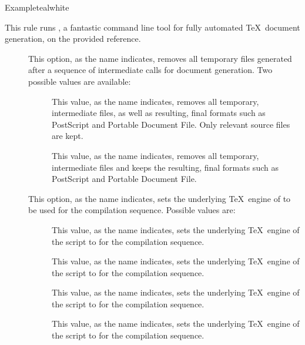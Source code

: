 \begin{description}
\begin{codebox}{Example}{teal}{\icnote}{white}
\end{codebox}

\item[\rulebox{latexmk}{Marco Daniel, Brent Longborough, Paulo Cereda}] This rule runs , a fantastic command line tool for fully automated \TeX\ document generation, on the provided  reference.

\begin{description}
\item[] This option, as the name indicates, removes all temporary files generated after a sequence of intermediate calls for document generation. Two possible values are available:

\begin{description}
\item[] This value, as the name indicates, removes all temporary, intermediate files, as well as resulting, final formats such as PostScript and Portable Document File. Only relevant source files are kept.

\item[] This value, as the name indicates, removes all temporary, intermediate files and keeps the resulting, final formats such as PostScript and Portable Document File.
\end{description}

\item[] This option, as the name indicates, sets the underlying \TeX\ engine of  to be used for the compilation sequence. Possible values are:

\begin{description}
\item[] This value, as the name indicates, sets the underlying \TeX\ engine of the script to  for the compilation sequence.

\item[] This value, as the name indicates, sets the underlying \TeX\ engine of the script to  for the compilation sequence.

\item[] This value, as the name indicates, sets the underlying \TeX\ engine of the script to  for the compilation sequence.

\item[] This value, as the name indicates, sets the underlying \TeX\ engine of the script to  for the compilation sequence.
\end{description}


\end{description}
\end{description}
